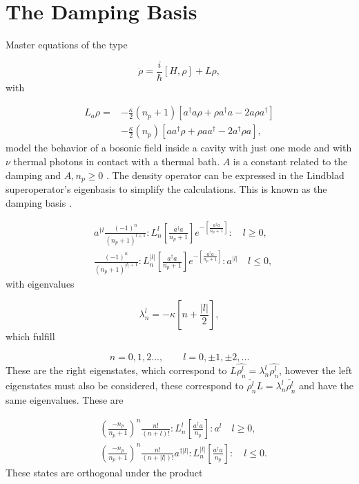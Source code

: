\documentclass[reprint, amsmath,amssymb, aps,pra]{revtex4-1}
\begin{document}
\appendix
\section{The Damping Basis}\label{App1}

Master equations of the type 

\begin{equation}
\dot{\rho} = \frac{i}{\hbar}[H,\rho]+L\rho, 
\end{equation} with

\begin{align}\label{EMField}
L_a \rho =& - \frac{\kappa}{2}(n_p+1)[a^\dagger a\rho + \rho a^\dagger a -2a\rho a^\dagger] \nonumber \\
 &- \frac{\kappa}{2}(n_p)[ aa^\dagger\rho + \rho  aa^\dagger -2a^\dagger\rho a],
\end{align} model the behavior of a bosonic field inside a cavity with just one mode and with $\nu$ thermal photons in contact with a thermal bath. $A$ is a constant related to the damping and $A,n_p \geq 0$  \cite{EnglertDB}. The density operator can be expressed in the Lindblad superoperator's eigenbasis to simplify the calculations. This is known as the damping basis \cite{EnglertDB}.

\begin{align}\label{DefDB}
&a^{\dagger l}\frac{(-1)^n}{(n_p+1)^{l+1}}:L_n^l[\frac{a^\dagger a}{n_p+1}]e^{-[\frac{a^\dagger a}{n_p+1}]}:\quad l \geq 0, \\
&\frac{(-1)^n}{(n_p+1)^{|l|+1}}:L_n^{|l|}[\frac{a^\dagger a}{n_p+1}]e^{-[\frac{a^\dagger a}{n_p+1}]}:a^{|l|}\quad l \leq 0,
\end{align} with eigenvalues

\begin{equation}
\lambda_n^l = -\kappa[n + \frac{|l|}{2}],
\end{equation} which fulfill

\begin{equation}
n=0,1,2...,\qquad l = 0,\pm 1, \pm 2,... 
\end{equation} These are the right eigenstates, which correspond to $L\hat{\rho_n^l} = \lambda_n^l\hat{\rho_n^l}$, however the left eigenstates must also be considered, these correspond to $\check{\rho_n^l}L = \lambda_n^l\check{\rho_n^l}$ and have the same eigenvalues. These are

\begin{align}\label{DefDBDual}
&(\frac{-n_p}{n_p+1})^n\frac{n!}{(n+l)!}:L_n^l[\frac{a^\dagger a}{n_p}]:a^{l}\quad l \geq 0, \\
&(\frac{-n_p}{n_p+1})^n\frac{n!}{(n+|l|)!}a^{\dagger|l|}:L_n^{|l|}[\frac{a^\dagger a}{n_p}]:\quad l \leq 0.
\end{align} These states are orthogonal under the product
\end{document}
